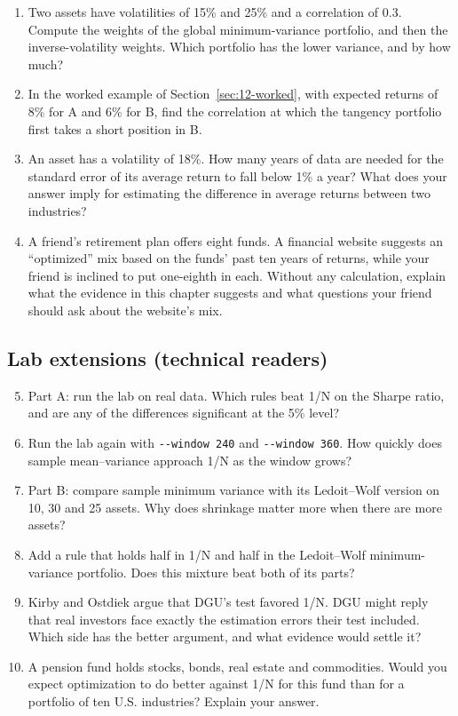 \begin{enumerate}
  \item Two assets have volatilities of 15\% and 25\% and a correlation of 0.3. Compute the weights of the global minimum-variance portfolio, and then the inverse-volatility weights. Which portfolio has the lower variance, and by how much?
  \item In the worked example of Section~\ref{sec:12-worked}, with expected returns of 8\% for A and 6\% for B, find the correlation at which the tangency portfolio first takes a short position in B.
  \item An asset has a volatility of 18\%. How many years of data are needed for the standard error of its average return to fall below 1\% a year? What does your answer imply for estimating the difference in average returns between two industries?
  \item A friend's retirement plan offers eight funds. A financial website suggests an ``optimized'' mix based on the funds' past ten years of returns, while your friend is inclined to put one-eighth in each. Without any calculation, explain what the evidence in this chapter suggests and what questions your friend should ask about the website's mix.
\end{enumerate}

\subsection*{Lab extensions (technical readers)}

\begin{enumerate}
  \setcounter{enumi}{4}
  \item Part A: run the lab on real data. Which rules beat 1/N on the Sharpe ratio, and are any of the differences significant at the 5\% level?
  \item Run the lab again with \texttt{-{}-window 240} and \texttt{-{}-window 360}. How quickly does sample mean--variance approach 1/N as the window grows?
  \item Part B: compare sample minimum variance with its Ledoit--Wolf version on 10, 30 and 25 assets. Why does shrinkage matter more when there are more assets?
  \item Add a rule that holds half in 1/N and half in the Ledoit--Wolf minimum-variance portfolio. Does this mixture beat both of its parts?
  \item Kirby and Ostdiek argue that DGU's test favored 1/N. DGU might reply that real investors face exactly the estimation errors their test included. Which side has the better argument, and what evidence would settle it?
  \item A pension fund holds stocks, bonds, real estate and commodities. Would you expect optimization to do better against 1/N for this fund than for a portfolio of ten U.S. industries? Explain your answer.
\end{enumerate}